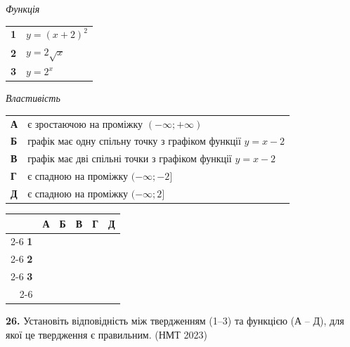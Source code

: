 \documentclass[14pt]{extarticle}
\newcommand{\answerGrid}{
    \begingroup
    \renewcommand{\arraystretch}{1.3} 
    \setlength{\tabcolsep}{7pt} 
    \begin{tabular}{r|c|c|c|c|c|}
         \multicolumn{1}{c}{} & \multicolumn{1}{c}{\textbf{А}} & \multicolumn{1}{c}{\textbf{Б}} & \multicolumn{1}{c}{\textbf{В}} & \multicolumn{1}{c}{\textbf{Г}} & \multicolumn{1}{c}{\textbf{Д}} \\ \cline{2-6}
         \textbf{1} & & & & & \\ \cline{2-6}
         \textbf{2} & & & & & \\ \cline{2-6}
         \textbf{3} & & & & & \\ \cline{2-6}
    \end{tabular}
    \endgroup
}
\newcommand{\nmtyear}[1]{\hfill{\small\color{yearcolor}(НМТ #1)}}
\begin{document}
\noindent
\begin{minipage}[t]{0.45\textwidth}
    \textit{Функція} \par \vspace{0.2cm}
    \begin{tabular}{@{}p{0.5cm} l@{}}
    \textbf{1} & $y=(x+2)^2$ \\[0.4cm]
    \textbf{2} & $y=2\sqrt{x}$ \\[0.4cm]
    \textbf{3} & $y=2^x$ \\
    \end{tabular}
\end{minipage}%
\hfill
\begin{minipage}[t]{0.50\textwidth}
    \textit{Властивість} \par \vspace{0.2cm}
    \begin{tabular}{@{}p{0.5cm} p{7cm}@{}}
    \textbf{А} & є зростаючою на проміжку $(-\infty; +\infty)$ \\[0.2cm]
    \textbf{Б} & графік має одну спільну точку з графіком функції $y=x-2$ \\[0.2cm]
    \textbf{В} & графік має дві спільні точки з графіком функції $y=x-2$ \\[0.2cm]
    \textbf{Г} & є спадною на проміжку $(-\infty; -2]$ \\[0.2cm]
    \textbf{Д} & є спадною на проміжку $(-\infty; 2]$ \\
    \end{tabular}
\end{minipage}

\vspace{0.3cm}
\answerGrid

\vspace{0.7cm}
\noindent\textbf{26.} Установіть відповідність між твердженням (1–3) та функцією (А – Д), для якої це твердження є правильним. \nmtyear{2023}

\vspace{0.3cm}
\end{document}
